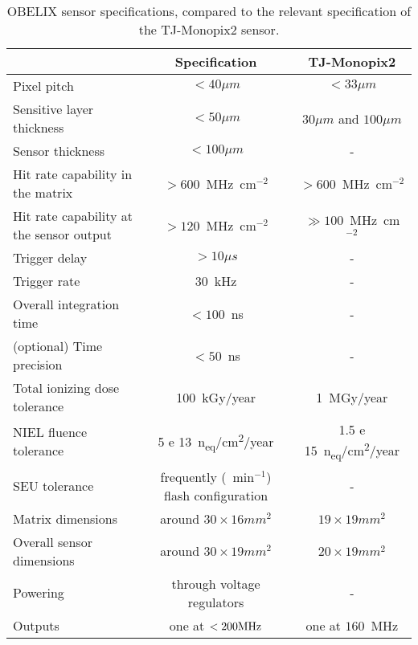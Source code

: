 \begin{sidewaystable}

\centering
\begin{tabular}{lc|c}
\hline
\hline
 & Specification & TJ-Monopix2\\
\hline
Pixel pitch & $< 40 \mu m$ & $< 33 \mu m$ \\
Sensitive layer thickness & $< 50 \mu m$ & $30 \mu m$ and $ 100\mu m$ \\
Sensor thickness & $< 100\mu m$ & - \\
\hline
Hit rate capability in the matrix & $> 600$~MHz~cm$^{-2}$ & $> 600$~MHz~cm$^{-2}$ \\
Hit rate capability at the sensor output & $>120$~MHz~cm$^{-2}$ & $\gg 100$~MHz~cm$^{-2}$ \\
Trigger delay & $>10 \mu s$ & - \\
Trigger rate & $30$~kHz & - \\
Overall integration time & $<100$~ns & - \\
(optional) Time precision & $<50$~ns & - \\
\hline
Total ionizing dose tolerance & 100~kGy/year & 1~MGy/year \\
NIEL fluence tolerance & \SI{5 e 13}{n_{eq}/cm^2/year}  & \SI{1.5 e 15}{n_{eq}/cm^2/year} \\
SEU tolerance & frequently (~min$^{-1}$) flash configuration & - \\
\hline
Matrix dimensions & around $30 \times 16 mm^{2}$ & $19 \times 19 mm^{2}$ \\
Overall sensor dimensions & around $30 \times 19 mm^{2}$ & $20 \times 19 mm^{2}$\\
Powering & through voltage regulators & - \\
Outputs & one at $<200 \rm{ MHz}$ & one at $160$~MHz \\
\hline
\hline
\end{tabular}
\caption{OBELIX sensor specifications, compared to the relevant specification of the TJ-Monopix2 sensor.}
\label{tab:obelix_specification}
\end{sidewaystable}

\begin{comment}
\begin{table}[h!]
\centering
\texttt{[image: obelix\_specification]}
\caption{Comparison between BELLE II requirements and TJ-Monopix2 features.}
\label{tab:obelix_specification}
\end{table}
\end{comment}

